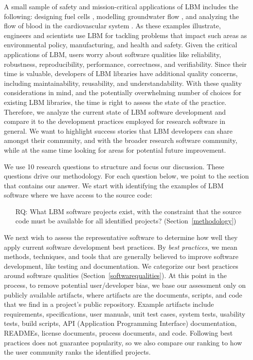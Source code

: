 \documentclass[final, 3p, times, authoryear]{elsarticle}
\newcounter{rqnum} %
\begin{document}
A small sample of safety and mission-critical applications of LBM includes the
following: designing fuel cells \citep{ZhangEtAl2018}, modelling groundwater
flow \citep{AnwarAndSukop2009}, and analyzing the flow of blood in the
cardiovascular system \citep{SadeghiEtAl2022b, SadeghiEtAl2022,
SadeghiEtAl2020}.  As these examples illustrate, engineers and scientists use
LBM for tackling problems that impact such areas as environmental policy,
manufacturing, and health and safety. Given the critical applications of LBM,
users worry about software qualities like reliability, robustness,
reproducibility, performance, correctness, and verifiability.  Since their time
is valuable, developers of LBM libraries have additional quality concerns,
including maintainability, reusability, and understandability.  With these
quality considerations in mind, and the potentially overwhelming number of
choices for existing LBM libraries, the time is right to assess the state of the
practice. Therefore, we analyze the current state of LBM software development
and compare it to the development practices employed for research software in
general.  We want to highlight success stories that LBM developers can share
amongst their community, and with the broader research software community, while
at the same time looking for areas for potential future improvement.

We use 10 research questions to structure and focus our discussion. These
questions drive our methodology. 
For each question below, we point to the section that contains our answer.  We
start with identifying the examples of LBM software where we have access to the
source code:

\begin{enumerate}
	\item[RQ\refstepcounter{rqnum}\therqnum \label{RQ_WhatProjects}:] What LBM
	software projects exist, with the constraint that the source code must be
	available for all identified projects? (Section~\ref{methodology})
\end{enumerate}

We next wish to assess the representative software to determine how well they
apply current software development best practices.  By \emph{best practices}, we
mean methods, techniques, and tools that are generally believed to improve
software development, like testing and documentation.  We categorize our best
practices around software qualities (Section~\ref{softwarequalities}).  At this
point in the process, to remove potential user/developer bias, we base our
assessment only on publicly available artifacts, where artifacts are the
documents, scripts, and code that we find in a project's public repository.
Example artifacts include requirements, specifications, user manuals, unit test
cases, system tests, usability tests, build scripts, API (Application
Programming Interface) documentation, READMEs, license documents, process
documents, and code. Following best practices does not guarantee popularity, so
we also compare our ranking to how the user community ranks the identified
projects.
\end{document}
